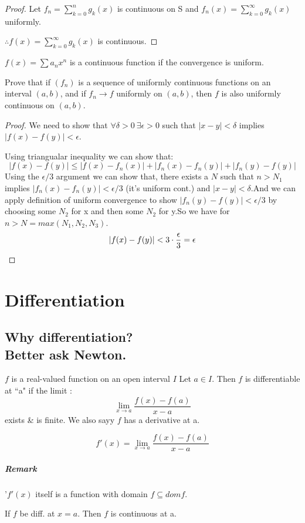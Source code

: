 \documentclass{notes}
\begin{document}
\begin{proof}
	Let $f_n = \sum_{k = 0}^{n} g_k(x)$ is continuous on S and $f_n(x) = \sum_{k = 0}^{\infty} g_k(x)$ uniformly.
	
	$\therefore f(x) = \sum_{k = 0}^{\infty} g_k(x)$ is continuous.
\end{proof}

\begin{corollary}{}
	$f(x) = \sum a_n x^n $ is a continuous function if the convergence is uniform.
\end{corollary}
\begin{problem}
	Prove that if $(f_n)$ is a sequence of uniformly continuous functions
	on an interval $(a, b)$, and if $f_n\to f$ uniformly on $(a, b)$, then $f$ is
	also uniformly continuous on $(a, b)$.
\end{problem}
\begin{proof}
	We need to show that $\forall \delta>0\ \exists \epsilon>0$ such that $|x-y|<\delta$ implies $|f(x)-f(y)|<\epsilon.$
	
Using triangualar inequality we can show that:
$$|f(x)-f(y)| \leq |f(x)-f_n (x)|+|f_n(x)-f_n(y)|+|f_n (y)-f(y)|$$ 
Using the $\epsilon/3$ argument we can show that, there exists a $N$ such that $n>N_1$ implies $ |f_n(x)-f_n(y)| <\epsilon/3$ (it's uniform cont.) and $|x-y| < \delta$.And we can apply definition of uniform convergence to show $|f_n (y)-f(y)| < \epsilon/3$ by choosing some $N_2$ for x and then some $N_2$ for y.So we have for $n> N = max(N_1,N_2,N_3)$. 
$$|f(x)-f(y)| < 3\cdot {\epsilon \over 3}= \epsilon$$

\end{proof}


\chapter{Differentiation}
\section{Why differentiation? \\ Better ask Newton.}
\begin{definition}{}
	$f$ is a real-valued function on an open interval $I$ Let $a \in I$. Then $f$ is differentiable at ``a" if the limit :
	$$ \lim\limits_{x \to a} \frac{f(x)-f(a)}{x-a}$$
	exists \& is finite. We also sayy $f$ has a derivative at a.
	
	$$ f'(x) = \lim\limits_{x \to a} \frac{f(x)-f(a)}{x-a}$$ 
	
	\paragraph{Remark}
	'$f'(x)$ itself is a function with domain $f \subseteq dom f$.
\end{definition}
\begin{theorem}{}
If	$f$ be diff. at $x = a$. Then $f$ is continuous at a.
\end{theorem}
\end{document}

